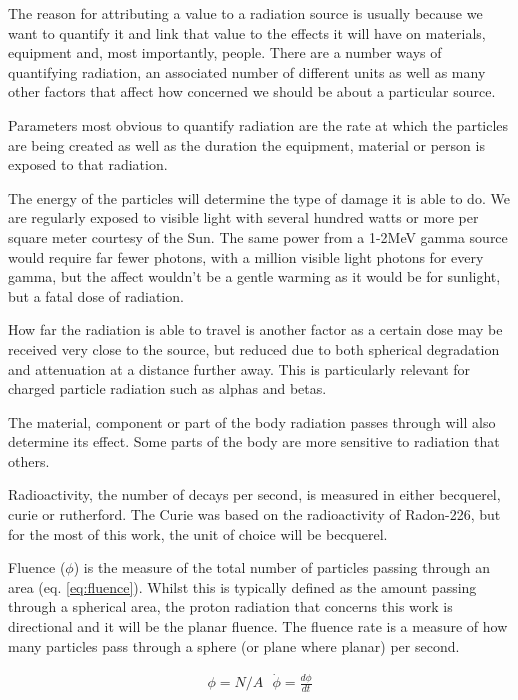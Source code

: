 The reason for attributing a value to a radiation source is usually because we want to quantify it and link that value to the effects it will have on materials, equipment and, most importantly, people.  There are a number ways of quantifying radiation, an associated number of different units as well as many other factors that affect how concerned we should be about a particular source.

Parameters most obvious to quantify radiation are the rate at which the particles are being created as well as the duration the equipment, material or person is exposed to that radiation. 

The energy of the particles will determine the type of damage it is able to do.  We are regularly exposed to visible light with several hundred watts or more per square meter courtesy of the Sun.  The same power from a 1-2MeV gamma source would require far fewer photons, with a million visible light photons for every gamma, but the affect wouldn't be a gentle warming as it would be for sunlight, but a fatal dose of radiation.

How far the radiation is able to travel is another factor as a certain dose may be received very close to the source, but reduced due to both spherical degradation and attenuation at a distance further away.  This is particularly relevant for charged particle radiation such as alphas and betas.

The material, component or part of the body radiation passes through will also determine its effect.  Some parts of the body are more sensitive to radiation that others.




Radioactivity, the number of decays per second, is measured in either \Gls{becquerel}, \Gls{curie} or \gls{rutherford}.  The Curie was based on the radioactivity of Radon-226, but for the most of this work, the unit of choice will be \gls{becquerel}.

Fluence ($\phi$) is the measure of the total number of particles passing through an area (eq. \ref{eq:fluence}).  Whilst this is typically defined as the amount passing through a spherical area, the proton radiation that concerns this work is directional and it will be the planar fluence\cite{dosimetrygreening}.  The fluence rate is a measure of how many particles pass through a sphere (or plane where planar) per second.

\begin{equation}
\begin{split}
\phi = N/A \text{    } \dot{\phi} = \frac{d\phi}{dt} 
\label{eq:fluence}
\end{split}
\end{equation}

